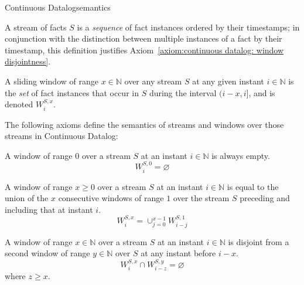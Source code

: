 \begin{nestedsection}{Continuous Datalog}{semantics}
\begin{definition}
A stream of facts $S$ is a \emph{sequence} of fact instances ordered
by their timestamps; in conjunction with the distinction between
multiple instances of a fact by their timestamp, this definition justifies
Axiom~\ref{axiom:continuous datalog: window disjointness}.
\end{definition}

\begin{definition}
A sliding window of range ${x \in \mathbb{N}}$ over any stream $S$ at
any given instant ${i \in \mathbb{N}}$ is the \emph{set} of fact
instances that occur in $S$ during the interval ${(i-x,i]}$, and is
denoted ${W^{S,x}_{i}}$.
\end{definition}

The following axioms define the semantics of streams and windows over
those streams in Continuous Datalog:

\begin{axiom}\label{axiom:continuous datalog: window range leq 0}
A window of range $0$ over a stream $S$ at an instant 
${i \in \mathbb{N}}$ is always empty.
\begin{equation*}
W^{S,0}_{i} = \varnothing
\end{equation*}
\end{axiom}

\begin{axiom}\label{axiom:continuous datalog: window composition}
A window of range ${x \ge 0}$ over a stream $S$ at an instant 
${i \in \mathbb{N}}$ is equal to the union of the $x$ consecutive
windows of range $1$ over the stream $S$ preceding and including that at
instant $i$.
\begin{equation*}
W^{S,x}_{i} = \mathop{\cup}_{j=0}^{x-1} W^{S,1}_{i-j}
\end{equation*}
\end{axiom}

\begin{axiom}\label{axiom:continuous datalog: window disjointness}
A window of range ${x \in \mathbb{N}}$ over a stream $S$ at an
instant ${i \in \mathbb{N}}$ is disjoint from a second window of 
range ${y \in \mathbb{N}}$ over $S$ at any instant before $i - x$.
\begin{equation*}
W^{S,x}_{i} \cap W^{S,y}_{i-z} = \varnothing
\end{equation*}
where $z \geq x$.
\end{axiom}


\end{nestedsection}
